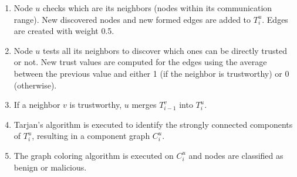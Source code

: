 \begin{enumerate}
	\item Node $u$ checks which are its neighbors (nodes within its communication range).
		  New discovered nodes and new formed edges are added to $T^u_i$.
		  Edges are created with weight 0.5.
	\item Node $u$ tests all its neighbors to discover which ones can be directly trusted or not.
		  New trust values are computed for the edges using the average between the previous value and either 1 (if the neighbor is trustworthy) or 0 (otherwise).
	\item If a neighbor $v$ is trustworthy, $u$ merges $T^v_{i-1}$ into $T^u_i$.
	\item Tarjan's algorithm is executed to identify the strongly connected components of $T^u_i$, resulting in a component graph $C^u_i$.
	\item The graph coloring algorithm is executed on $C^u_i$ and nodes are classified as benign or malicious.
\end{enumerate}


